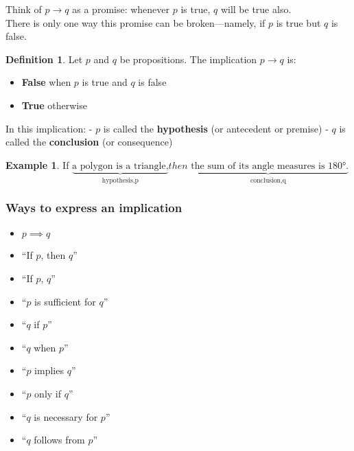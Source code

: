 \documentclass[
]{book}
\providecommand{\tightlist}{%
  \setlength{\itemsep}{0pt}\setlength{\parskip}{0pt}}
\theoremstyle{definition}
\newtheorem{definition}{Definition}[chapter]
\theoremstyle{definition}
\newtheorem{example}{Example}[chapter]
\theoremstyle{definition}
\theoremstyle{definition}
\theoremstyle{remark}
\begin{document}
Think of \(p \rightarrow q\) as a promise: whenever \(p\) is true, \(q\) will be true also.\\
There is only one way this promise can be broken---namely, if \(p\) is true but \(q\) is false.

\begin{definition}
\protect\hypertarget{def:unnamed-chunk-21}{}\label{def:unnamed-chunk-21}Let \(p\) and \(q\) be propositions. The implication \(p \rightarrow q\) is:

\begin{itemize}
\tightlist
\item
  \textbf{False} when \(p\) is true and \(q\) is false\\
\item
  \textbf{True} otherwise
\end{itemize}

In this implication:
- \(p\) is called the \textbf{hypothesis} (or antecedent or premise)
- \(q\) is called the \textbf{conclusion} (or consequence)
\end{definition}

\begin{example}
\protect\hypertarget{exm:unnamed-chunk-22}{}\label{exm:unnamed-chunk-22}If \(\underbrace{\text{a polygon is a triangle,}}_\text{hypothesis,p}
 then
\underbrace{ \text{ the sum of its angle measures is 180°.}}_\text{conclusion,q}\)
\end{example}

\subsubsection{Ways to express an implication}\label{ways-to-express-an-implication}

\begin{itemize}
\tightlist
\item
  \(p \implies q\)
\item
  ``If \(p\), then \(q\)''
\item
  ``If \(p\), \(q\)''
\item
  ``\(p\) is sufficient for \(q\)''
\item
  ``\(q\) if \(p\)''
\item
  ``\(q\) when \(p\)''
\item
  ``\(p\) implies \(q\)''
\item
  ``\(p\) only if \(q\)''
\item
  ``\(q\) is necessary for \(p\)''
\item
  ``\(q\) follows from \(p\)''
\end{itemize}
\end{document}
